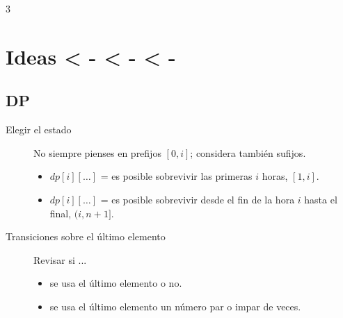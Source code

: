 \documentclass[8pt, spanish, mexico, letterpaper]{extarticle}
\newcommand{\<}{<}
\begin{document}
\begin{multicols*}{3}



\columnbreak

\section{Ideas  < - < - < - }

\subsection{DP}
\begin{description}
\item[Elegir el estado]
   No siempre pienses en prefijos $[0,i]$; considera también sufijos.
    \begin{itemize}
      \item $dp[i][\dots]$ = es posible sobrevivir las primeras $i$ horas, $[1,i]$.
      \item $dp[i][\dots]$ = es posible sobrevivir desde el fin de la hora $i$ hasta el final, $(i,n+1]$.
    \end{itemize}


\item[Transiciones sobre el último elemento]
  Revisar si ...
  \begin{itemize}
    \item se usa el último elemento o no.
    \item se usa el último elemento un número par o impar de veces.
  \end{itemize}


\end{description}
\end{multicols*}
\end{document}

